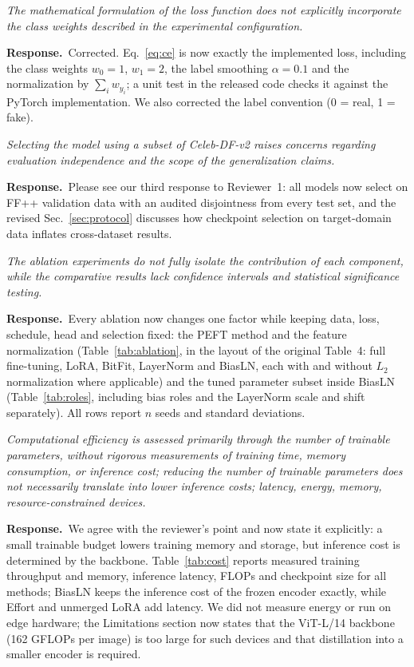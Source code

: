 \documentclass[11pt]{article}
\newenvironment{comment}{\par\medskip\noindent\begin{minipage}{\linewidth}\color{black!70}\itshape}{\end{minipage}\par\smallskip}
\newcommand{\resp}{\noindent\textbf{Response.}~}
\begin{document}
\begin{comment}
The mathematical formulation of the loss function does not explicitly incorporate the class weights described in the experimental configuration.
\end{comment}
\resp Corrected. Eq.~\eqref{eq:ce} is now exactly the implemented loss, including the class weights $w_0=1$, $w_1=2$, the label smoothing $\alpha=0.1$ and the normalization by $\sum_i w_{y_i}$; a unit test in the released code checks it against the PyTorch implementation. We also corrected the label convention (0 = real, 1 = fake).

\begin{comment}
Selecting the model using a subset of Celeb-DF-v2 raises concerns regarding evaluation independence and the scope of the generalization claims.
\end{comment}
\resp Please see our third response to Reviewer~1: all models now select on FF++ validation data with an audited disjointness from every test set, and the revised Sec.~\ref{sec:protocol} discusses how checkpoint selection on target-domain data inflates cross-dataset results.

\begin{comment}
The ablation experiments do not fully isolate the contribution of each component, while the comparative results lack confidence intervals and statistical significance testing.
\end{comment}
\resp Every ablation now changes one factor while keeping data, loss, schedule, head and selection fixed: the PEFT method and the feature normalization (Table~\ref{tab:ablation}, in the layout of the original Table~4: full fine-tuning, LoRA, BitFit, LayerNorm and BiasLN, each with and without $L_2$ normalization where applicable) and the tuned parameter subset inside BiasLN (Table~\ref{tab:roles}, including bias roles and the LayerNorm scale and shift separately). All rows report $n$ seeds and standard deviations.

\begin{comment}
Computational efficiency is assessed primarily through the number of trainable parameters, without rigorous measurements of training time, memory consumption, or inference cost; reducing the number of trainable parameters does not necessarily translate into lower inference costs; latency, energy, memory, resource-constrained devices.
\end{comment}
\resp We agree with the reviewer's point and now state it explicitly: a small trainable budget lowers training memory and storage, but inference cost is determined by the backbone. Table~\ref{tab:cost} reports measured training throughput and memory, inference latency, FLOPs and checkpoint size for all methods; BiasLN keeps the inference cost of the frozen encoder exactly, while Effort and unmerged LoRA add latency. We did not measure energy or run on edge hardware; the Limitations section now states that the ViT-L/14 backbone (162 GFLOPs per image) is too large for such devices and that distillation into a smaller encoder is required.
\end{document}
